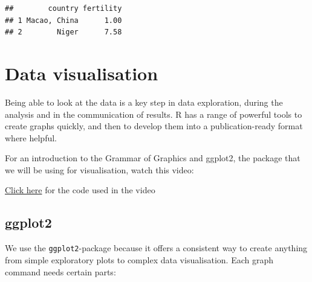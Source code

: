 \documentclass[
]{book}
\newenvironment{Shaded}{\begin{snugshade}}{\end{snugshade}}
\newcommand{\CommentTok}[1]{\textcolor[rgb]{0.56,0.35,0.01}{\textit{#1}}}
\newcommand{\KeywordTok}[1]{\textcolor[rgb]{0.13,0.29,0.53}{\textbf{#1}}}
\newcommand{\NormalTok}[1]{#1}
\newcommand{\OperatorTok}[1]{\textcolor[rgb]{0.81,0.36,0.00}{\textbf{#1}}}
\newcommand{\StringTok}[1]{\textcolor[rgb]{0.31,0.60,0.02}{#1}}
\begin{document}
\begin{Shaded}
\end{Shaded}

\begin{verbatim}
##        country fertility
## 1 Macao, China      1.00
## 2        Niger      7.58
\end{verbatim}

\hypertarget{data-visualisation}{%
\chapter{Data visualisation}\label{data-visualisation}}

Being able to look at the data is a key step in data exploration, during the analysis and in the communication of results. R has a range of powerful tools to create graphs quickly, and then to develop them into a publication-ready format where helpful.

For an introduction to the Grammar of Graphics and ggplot2, the package that we will be using for visualisation, watch this video:

\href{https://drive.google.com/open?id=1UGp7own42PkPv-TLbX29sQUu2DfeaMUp}{Click here} for the code used in the video

\hypertarget{ggplot2}{%
\section{ggplot2}\label{ggplot2}}

We use the \texttt{ggplot2}-package because it offers a consistent way to create anything from simple exploratory plots to complex data visualisation. Each graph command needs certain parts:
\end{document}
